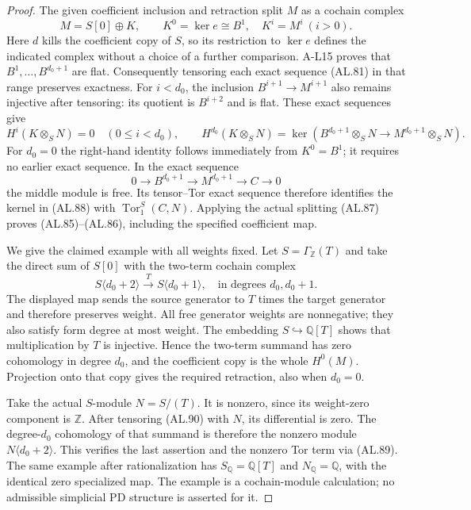 \begin{proof}
The given coefficient inclusion and retraction split
$M$ as a cochain complex
\[
 M=S[0]\oplus K,
 \qquad K^0=\ker e\cong B^1,\quad K^i=M^i\ (i>0).
 \tag{AL.87}
\]
Here $d$ kills the coefficient copy of $S$, so its
restriction to $\ker e$ defines the indicated complex
without a choice of a further comparison. A-L15 proves
that $B^1,\ldots,B^{d_0+1}$ are flat. Consequently
tensoring each exact sequence (AL.81) in that range
preserves exactness. For $i<d_0$, the inclusion
$B^{i+1}\to M^{i+1}$ also remains injective after
tensoring: its quotient is $B^{i+2}$ and is flat.
These exact sequences give
\[
 H^i(K\otimes_SN)=0\quad(0\leq i<d_0),\qquad
 H^{d_0}(K\otimes_SN)
 =\ker(B^{d_0+1}\otimes_SN\to M^{d_0+1}\otimes_SN).
 \tag{AL.88}
\]
For $d_0=0$ the right-hand identity follows immediately
from $K^0=B^1$; it requires no earlier exact sequence.
In the exact sequence
\[
 0\to B^{d_0+1}\to M^{d_0+1}\to C\to0
 \tag{AL.89}
\]
the middle module is free. Its tensor--Tor exact
sequence therefore identifies the kernel in (AL.88)
with $\operatorname{Tor}^S_1(C,N)$. Applying the actual
splitting (AL.87) proves (AL.85)--(AL.86), including
the specified coefficient map.

We give the claimed example with all weights fixed.
Let $S=\Gamma_{\mathbb Z}(T)$ and take the direct sum
of $S[0]$ with the two-term cochain complex
\[
 S\langle d_0+2\rangle
      \xrightarrow{\ T\ }S\langle d_0+1\rangle,
 \quad\text{in degrees }d_0,d_0+1.
 \tag{AL.90}
\]
The displayed map sends the source generator to $T$
times the target generator and therefore preserves
weight. All free generator weights are nonnegative;
they also satisfy form degree at most weight. The
embedding $S\hookrightarrow\mathbb Q[T]$ shows that
multiplication by $T$ is injective. Hence the two-term
summand has zero cohomology in degree $d_0$, and the
coefficient copy is the whole $H^0(M)$. Projection
onto that copy gives the required retraction, also
when $d_0=0$.

Take the actual $S$-module $N=S/(T)$. It is nonzero,
since its weight-zero component is $\mathbb Z$.
After tensoring (AL.90) with $N$, its differential is
zero. The degree-$d_0$ cohomology of that summand is
therefore the nonzero module $N\langle d_0+2\rangle$.
This verifies the last assertion and the nonzero Tor
term via (AL.89). The same example after rationalization
has $S_{\mathbb Q}=\mathbb Q[T]$ and $N_{\mathbb Q}
=\mathbb Q$, with the identical zero specialized map.
The example is a cochain-module calculation; no
admissible simplicial PD structure is asserted for it.
\end{proof}
